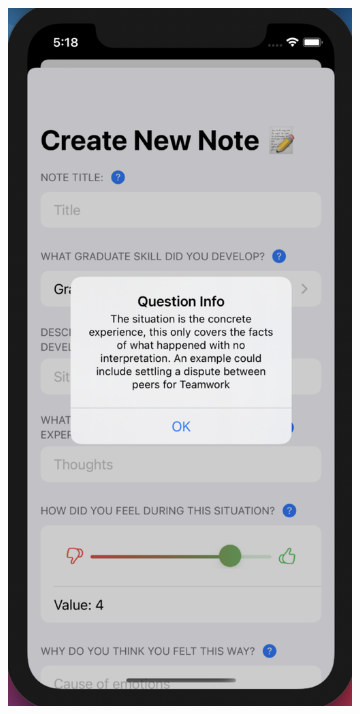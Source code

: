 \documentclass{l4proj}
\begin{document}
\begin{figure}
\begin{subfigure}[b]{0.3\textwidth}
        \label{fig:CreatingNote}
    \end{subfigure}
    \begin{subfigure}[b]{0.3\textwidth}
        \includegraphics[scale=0.25]{images/HelperButtonAlert.pdf}

\end{subfigure}
\end{figure}
\end{document}
